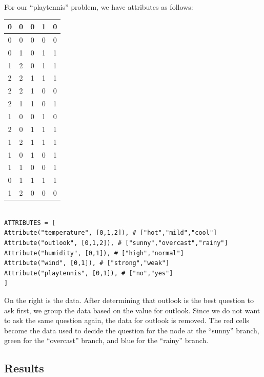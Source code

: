 \documentclass[11pt,a4paper]{article}
\begin{document}
For our ``playtennis'' problem, we have attributes as follows:

{
\begin{table}
\begin{tabular}{| c | c | c | c | c |}
\hline
\rowcolor[RGB]{255, 150, 150}
0 & \cellcolor{white}0 & 0 & 1 & 0 \\ \hline 
\rowcolor[RGB]{255, 150, 150}
0 & \cellcolor{white}0 & 0 & 0 & 0 \\ \hline 
\rowcolor[RGB]{150, 255, 150}
0 & \cellcolor{white}1 & 0 & 1 & 1 \\ \hline 
\rowcolor[RGB]{150, 150, 255}
1 & \cellcolor{white}2 & 0 & 1 & 1 \\ \hline 
\rowcolor[RGB]{150, 150, 255}
2 & \cellcolor{white}2 & 1 & 1 & 1 \\ \hline 
\rowcolor[RGB]{150, 150, 255}
2 & \cellcolor{white}2 & 1 & 0 & 0 \\ \hline
\rowcolor[RGB]{150, 255, 150}
2 & \cellcolor{white}1 & 1 & 0 & 1 \\ \hline 
\rowcolor[RGB]{255, 150, 150}
1 & \cellcolor{white}0 & 0 & 1 & 0 \\ \hline 
\rowcolor[RGB]{255, 150, 150}
2 & \cellcolor{white}0 & 1 & 1 & 1 \\ \hline 
\rowcolor[RGB]{150, 150, 255}
1 & \cellcolor{white}2 & 1 & 1 & 1 \\ \hline 
\rowcolor[RGB]{255, 150, 150}
1 & \cellcolor{white}0 & 1 & 0 & 1 \\ \hline 
\rowcolor[RGB]{150, 255, 150}
1 & \cellcolor{white}1 & 0 & 0 & 1 \\ \hline 
\rowcolor[RGB]{150, 255, 150}
0 & \cellcolor{white}1 & 1 & 1 & 1 \\ \hline 
\rowcolor[RGB]{150, 150, 255}
1 & \cellcolor{white}2 & 0 & 0 & 0 \\ \hline 
\end{tabular}
\end{table}

\begin{lstlisting}

ATTRIBUTES = [
Attribute("temperature", [0,1,2]), # ["hot","mild","cool"]
Attribute("outlook", [0,1,2]), # ["sunny","overcast","rainy"]
Attribute("humidity", [0,1]), # ["high","normal"]
Attribute("wind", [0,1]), # ["strong","weak"]
Attribute("playtennis", [0,1]), # ["no","yes"]
]
\end{lstlisting}

On the right is the data. After determining that outlook is the best question to ask first, we group the data based on the value for outlook. Since we do not want to ask the same question again, the data for outlook is removed. The red cells become the data used to decide the question for the node at the ``sunny'' branch, green for the ``overcast'' branch, and blue for the ``rainy'' branch.

\newpage
\subsection{Results}
\label{DecisionTrees:Results}
}
\end{document}
